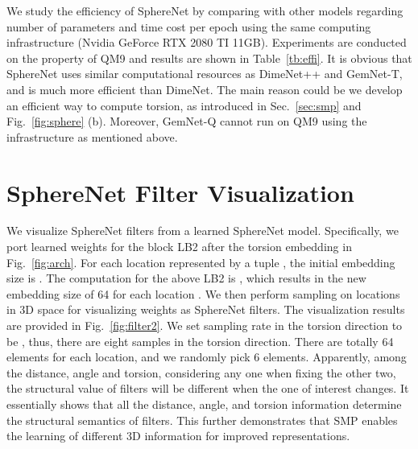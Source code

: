 \documentclass{article}
\begin{document}
We study the efficiency of SphereNet by comparing with other models regarding number of parameters
and time cost per epoch using the same computing 
infrastructure (Nvidia GeForce RTX 2080 TI 11GB).
Experiments are conducted on the property  of QM9 and results are shown in Table~\ref{tb:effi}. It is obvious that 
SphereNet uses similar computational resources
as DimeNet++ and GemNet-T, and is much more efficient than DimeNet.
The main reason could be we develop an efficient way
to compute torsion, as introduced
in Sec.~\ref{sec:smp} and Fig.~\ref{fig:sphere} (b).
Moreover, GemNet-Q cannot run on QM9 using the infrastructure as mentioned above.

\newpage

\section{SphereNet Filter Visualization}  \label{sec:supp_E}
We visualize SphereNet filters from a learned SphereNet model.
Specifically, we port learned weights for the block LB2 after the torsion embedding
 in Fig.~\ref{fig:arch}.
For each location represented by a tuple , the initial embedding size is
.
The computation for the above LB2 is ,
which results in the new embedding size of 64 for each location .
We then perform sampling on locations in 3D space for
visualizing weights as SphereNet filters.
The visualization results are provided in
Fig.~\ref{fig:filter2}. 
We set sampling rate in the torsion direction to be ,
thus, there are eight samples in the torsion direction.
There are totally 64 elements for each location, and we randomly pick 6
elements. Apparently, among the distance, angle and torsion, considering any one when fixing the other two, the structural value of filters will be different when the one of interest changes. It essentially shows that all the distance, angle, and torsion information determine the structural semantics of filters. This further demonstrates that SMP enables the learning of different 3D information for improved representations.
\end{document}
